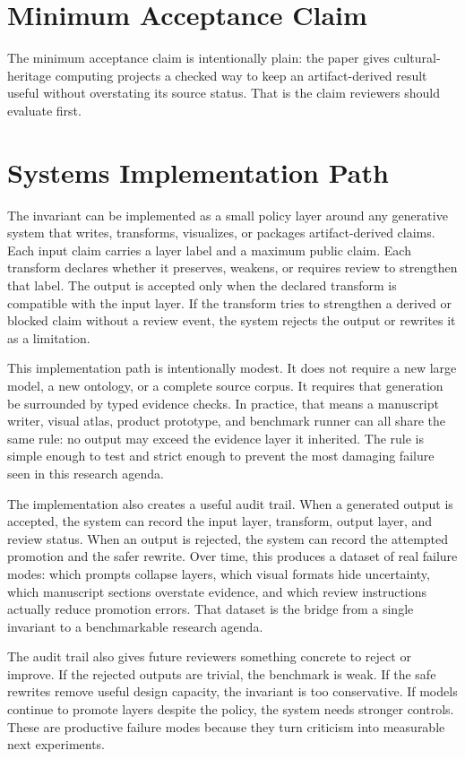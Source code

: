 \documentclass[sigconf,nonacm]{acmart}
\begin{document}
\section{Minimum Acceptance Claim}
The minimum acceptance claim is intentionally plain: the paper gives cultural-
heritage computing projects a checked way to keep an artifact-derived result
useful without overstating its source status. That is the claim reviewers should
evaluate first.


\section{Systems Implementation Path}
The invariant can be implemented as a small policy layer around any generative
system that writes, transforms, visualizes, or packages artifact-derived claims.
Each input claim carries a layer label and a maximum public claim. Each transform
declares whether it preserves, weakens, or requires review to strengthen that
label. The output is accepted only when the declared transform is compatible
with the input layer. If the transform tries to strengthen a derived or blocked
claim without a review event, the system rejects the output or rewrites it as a
limitation.

This implementation path is intentionally modest. It does not require a new
large model, a new ontology, or a complete source corpus. It requires that
generation be surrounded by typed evidence checks. In practice, that means a
manuscript writer, visual atlas, product prototype, and benchmark runner can all
share the same rule: no output may exceed the evidence layer it inherited. The
rule is simple enough to test and strict enough to prevent the most damaging
failure seen in this research agenda.

The implementation also creates a useful audit trail. When a generated output is
accepted, the system can record the input layer, transform, output layer, and
review status. When an output is rejected, the system can record the attempted
promotion and the safer rewrite. Over time, this produces a dataset of real
failure modes: which prompts collapse layers, which visual formats hide
uncertainty, which manuscript sections overstate evidence, and which review
instructions actually reduce promotion errors. That dataset is the bridge from a
single invariant to a benchmarkable research agenda.

The audit trail also gives future reviewers something concrete to reject or
improve. If the rejected outputs are trivial, the benchmark is weak. If the safe
rewrites remove useful design capacity, the invariant is too conservative. If
models continue to promote layers despite the policy, the system needs stronger
controls. These are productive failure modes because they turn criticism into
measurable next experiments.
\end{document}
